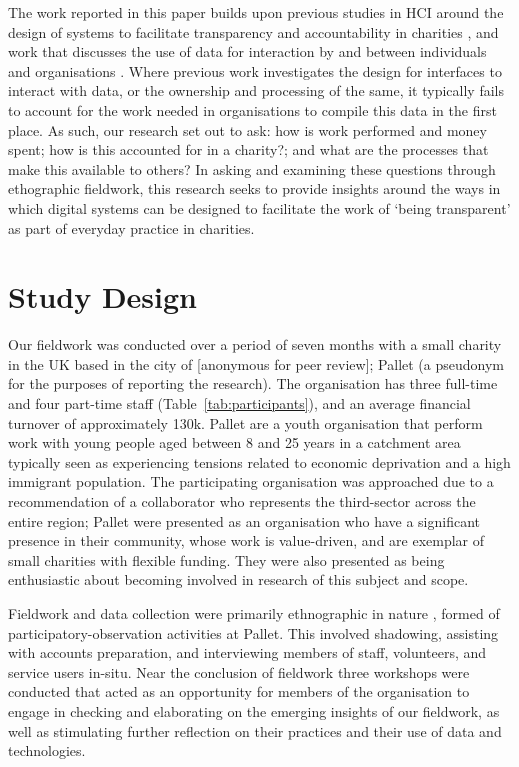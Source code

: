 The work reported in this paper builds upon previous studies in HCI around the design of systems to facilitate transparency and accountability in charities \cite{marshall_accountable:_2016}, and work that discusses the use of data for interaction by and between individuals and organisations \cite{crabtree_human_2015, elsden_resviz:_2016}. Where previous work investigates the design for interfaces to interact with data, or the ownership and processing of the same, it typically fails to account for the work needed in organisations to compile this data in the first place. As such, our research set out to ask: how is work performed and money spent; how is this accounted for in a charity?; and what are the processes that make this available to others? In asking and examining these questions through ethographic fieldwork, this research seeks to provide insights around the ways in which digital systems can be designed to facilitate the work of `being transparent' as part of everyday practice in charities.

\section{Study Design}
Our fieldwork was conducted over a period of seven months with a small charity in the UK based in the city of [anonymous for peer review]; Pallet (a pseudonym for the purposes of reporting the research). The organisation has three full-time and four part-time staff (Table~\ref{tab:participants}), and an average financial turnover of approximately \textsterling 130k. Pallet are a youth organisation that perform work with young people aged between 8 and 25 years in a catchment area typically seen as experiencing tensions related to economic deprivation and a high immigrant population. The participating organisation was approached due to a recommendation of a collaborator who represents the third-sector across the entire region; Pallet were presented as an organisation who have a significant presence in their community, whose work is value-driven, and are exemplar of small charities with flexible funding. They were also presented as being enthusiastic about becoming involved in research of this subject and scope.

Fieldwork and data collection were primarily ethnographic in nature \cite{crabtree_doing_2012}, formed of participatory-observation activities at Pallet. This involved shadowing, assisting with accounts preparation, and interviewing members of staff, volunteers, and service users in-situ. Near the conclusion of fieldwork three workshops were conducted that acted as an opportunity for members of the organisation to engage in checking and elaborating on the emerging insights of our fieldwork, as well as stimulating further reflection on their practices and their use of data and technologies.

